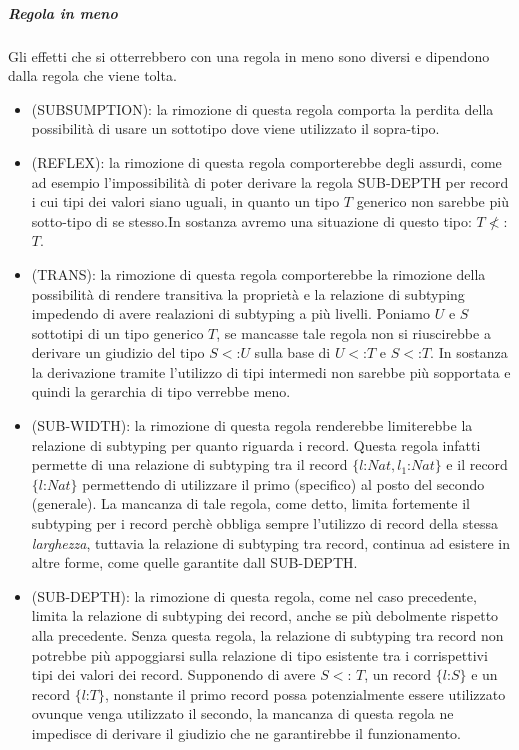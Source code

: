 \subparagraph*{Regola in meno}

Gli effetti che si otterrebbero con una regola in meno sono diversi e dipendono dalla regola che viene tolta.
\begin{itemize}
\item (SUBSUMPTION): la rimozione di questa regola comporta la perdita della possibilit\`a di usare un sottotipo dove viene utilizzato il sopra-tipo.
\item (REFLEX): la rimozione di questa regola comporterebbe degli assurdi, come ad esempio l'impossibilit\`a di poter derivare la regola SUB-DEPTH per record i cui tipi dei valori siano uguali, in quanto un tipo $T$ generico non sarebbe pi\`u sotto-tipo di se stesso.In sostanza avremo una situazione di questo tipo: $T \not <$: $T$.
\item (TRANS):  la rimozione di questa regola comporterebbe la rimozione della possibilit\`a di rendere transitiva la propriet\`a e la relazione di subtyping impedendo di avere realazioni di subtyping a pi\`u livelli. Poniamo $U$ e $S$ sottotipi di un tipo generico $T$, se mancasse tale regola non si riuscirebbe a derivare un giudizio del tipo $S <$:$U$ sulla base di $U<$:$T$ e $S<$:$T$. In sostanza la derivazione tramite l'utilizzo di tipi intermedi non sarebbe pi\`u sopportata e quindi la gerarchia di tipo verrebbe meno.
\item (SUB-WIDTH):
la rimozione di questa regola renderebbe limiterebbe la relazione di subtyping per quanto riguarda i record. Questa regola infatti permette di una relazione di subtyping tra il record $\{l$:$Nat,l_1$:$Nat\}$ e il record $\{l$:$Nat\}$ permettendo di utilizzare il primo (specifico) al posto del secondo (generale). La mancanza di tale regola, come detto, limita fortemente il subtyping per i record perch\`e obbliga sempre l'utilizzo di record della stessa \emph{larghezza}, tuttavia la relazione di subtyping tra record, continua ad esistere in altre forme, come quelle garantite dall SUB-DEPTH.
\item (SUB-DEPTH): 
la rimozione di questa regola, come nel caso precedente, limita la relazione di subtyping dei record, anche se pi\`u debolmente rispetto alla precedente. Senza questa regola, la relazione di subtyping tra record non potrebbe pi\`u appoggiarsi sulla relazione di tipo esistente tra i corrispettivi tipi dei valori dei record. Supponendo di avere $S <$: $T$, un record   $\{l$:$S\}$ e un record $\{l$:$T\}$, nonstante il primo record possa potenzialmente essere utilizzato ovunque venga utilizzato il secondo, la mancanza di questa regola ne impedisce di derivare il giudizio che ne garantirebbe il funzionamento.

\end{itemize}
